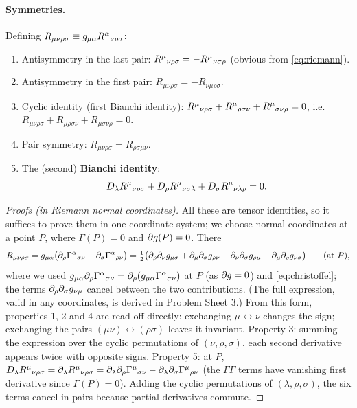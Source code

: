 \paragraph{Symmetries.} Defining $R_{\mu\nu\rho\sigma}\equiv g_{\mu\alpha}R^{\alpha}{}_{\nu\rho\sigma}$:
\begin{enumerate}
\item Antisymmetry in the last pair: $R^{\mu}{}_{\nu\rho\sigma}=-R^{\mu}{}_{\nu\sigma\rho}$ (obvious from \eqref{eq:riemann}).
\item Antisymmetry in the first pair: $R_{\mu\nu\rho\sigma}=-R_{\nu\mu\rho\sigma}$.
\item Cyclic identity (first Bianchi identity): $R^{\mu}{}_{\nu\rho\sigma}+R^{\mu}{}_{\rho\sigma\nu}+R^{\mu}{}_{\sigma\nu\rho}=0$, i.e.\ $R_{\mu\nu\rho\sigma}+R_{\mu\rho\sigma\nu}+R_{\mu\sigma\nu\rho}=0$.
\item Pair symmetry: $R_{\mu\nu\rho\sigma}=R_{\rho\sigma\mu\nu}$.
\item The (second) \textbf{Bianchi identity}:
\begin{equation}
  D_\lambda R^{\mu}{}_{\nu\rho\sigma}+D_\rho R^{\mu}{}_{\nu\sigma\lambda}+D_\sigma R^{\mu}{}_{\nu\lambda\rho}=0 .
  \label{eq:bianchi}
\end{equation}
\end{enumerate}
\begin{proof}[Proofs (in Riemann normal coordinates)]
All these are tensor identities, so it suffices to prove them in one coordinate system; we choose normal coordinates at a point $P$, where $\Gamma(P)=0$ and $\partial g(P)=0$. There
\[
  R_{\mu\nu\rho\sigma}=g_{\mu\alpha}\big(\partial_\rho\Gamma^{\alpha}{}_{\sigma\nu}-\partial_\sigma\Gamma^{\alpha}{}_{\rho\nu}\big)
  =\tfrac12\big(\partial_\rho\partial_\nu g_{\mu\sigma}+\partial_\mu\partial_\sigma g_{\rho\nu}-\partial_\nu\partial_\sigma g_{\rho\mu}-\partial_\mu\partial_\rho g_{\nu\sigma}\big)\qquad\text{(at $P$)},
\]
where we used $g_{\mu\alpha}\partial_\rho\Gamma^{\alpha}{}_{\sigma\nu}=\partial_\rho(g_{\mu\alpha}\Gamma^{\alpha}{}_{\sigma\nu})$ at $P$ (as $\partial g=0$) and \eqref{eq:christoffel}; the terms $\partial_\rho\partial_\sigma g_{\nu\mu}$ cancel between the two contributions. (The full expression, valid in any coordinates, is derived in Problem Sheet 3.) From this form, properties 1, 2 and 4 are read off directly: exchanging $\mu\leftrightarrow\nu$ changes the sign; exchanging the pairs $(\mu\nu)\leftrightarrow(\rho\sigma)$ leaves it invariant. Property 3: summing the expression over the cyclic permutations of $(\nu,\rho,\sigma)$, each second derivative appears twice with opposite signs. Property 5: at $P$, $D_\lambda R^\mu{}_{\nu\rho\sigma}=\partial_\lambda R^\mu{}_{\nu\rho\sigma}=\partial_\lambda\partial_\rho\Gamma^{\mu}{}_{\sigma\nu}-\partial_\lambda\partial_\sigma\Gamma^{\mu}{}_{\rho\nu}$ (the $\Gamma\Gamma$ terms have vanishing first derivative since $\Gamma(P)=0$). Adding the cyclic permutations of $(\lambda,\rho,\sigma)$, the six terms cancel in pairs because partial derivatives commute.
\end{proof}

